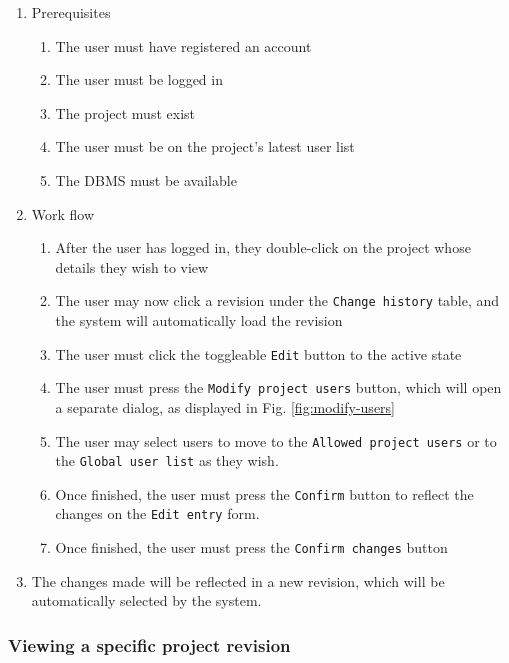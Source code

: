 \documentclass{report}
\begin{document}
	\begin{enumerate}
		\item Prerequisites
		\begin{enumerate}
			\item The user must have registered an account
			\item The user must be logged in
			\item The project must exist 
			\item The user must be on the project's latest user list
			\item The DBMS must be available
		\end{enumerate}
		\item Work flow
		\begin{enumerate}
			\item After the user has logged in, they double-click on the project whose details they wish
			to view
			\item The user may now click a revision under the \verb|Change history| table, and the system
			will automatically load the revision
			\item The user must click the toggleable \verb|Edit| button to the active state
			\item The user must press the \verb|Modify project users| button, which will open a separate
					  dialog, as displayed in Fig. \ref{fig:modify-users}
			\item The user may select users to move to the \verb|Allowed project users| or to the
					  \verb|Global user list| as they wish.
			\item Once finished, the user must press the \verb|Confirm| button to reflect the changes on
					  the \verb|Edit entry| form.
			\item Once finished, the user must press the \verb|Confirm changes| button
		\end{enumerate}
		\item The changes made will be reflected in a new revision, which will be automatically selected
				  by the system.
	\end{enumerate}	
	
	\subsubsection{Viewing a specific project revision}
\end{document}
